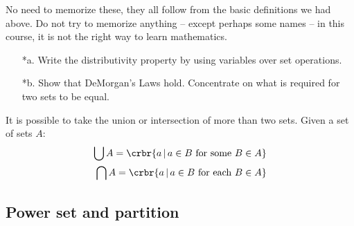 \documentclass[11pt]{article}
\begin{document}
{%

\item No need to memorize these, they all follow from the basic definitions we
had above. Do not try to memorize anything -- except perhaps some names -- in
this course, it is not the right way to
learn mathematics.  


\hrulefill
\begin{uexercise}
\begin{itemize}
\item[]
\item[*a.]\label{ex-dist} Write the distributivity property by using variables over set operations.
\item[*b.]\label{ex-demorg} Show that DeMorgan's Laws hold.  Concentrate on what is required for
two sets to be equal.
\end{itemize}
\end{uexercise}
\hrulefill


\item It is possible to take the union or intersection of more than two sets. Given a set of sets $A$:
\begin{align*}
	\bigcup A = \crbr{a\, |\, a \in B\text{ for some }B \in A}\\
	\bigcap A = \crbr{a\, |\, a \in B\text{ for each }B \in A}
\end{align*}

}

\subsection{Power set and partition}
\end{document}
